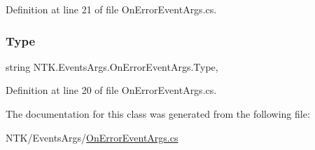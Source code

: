 Definition at line 21 of file On\+Error\+Event\+Args.\+cs.

\mbox{\label{class_n_t_k_1_1_events_args_1_1_on_error_event_args_ab28ffedcb617e67f9ecd76a1194a0333}} 
\subsubsection{\texorpdfstring{Type}{Type}}
{\footnotesize\ttfamily string N\+T\+K.\+Events\+Args.\+On\+Error\+Event\+Args.\+Type\hspace{0.3cm}{\ttfamily [get]}, {\ttfamily [set]}}



Definition at line 20 of file On\+Error\+Event\+Args.\+cs.



The documentation for this class was generated from the following file\+:\begin{DoxyCompactItemize}
\item 
N\+T\+K/\+Events\+Args/\mbox{\hyperlink{_on_error_event_args_8cs}{On\+Error\+Event\+Args.\+cs}}\end{DoxyCompactItemize}
